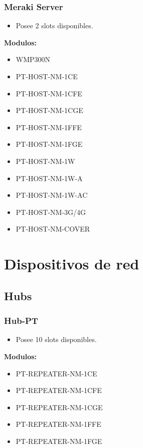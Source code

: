 \documentclass{article}
\begin{document}
\subsubsection{Meraki Server}
\begin{itemize}
    \item Posee 2 slots disponibles.
\end{itemize}
\textbf{Modulos:}
\begin{itemize}
    \item WMP300N
    \item PT-HOST-NM-1CE
    \item PT-HOST-NM-1CFE
    \item PT-HOST-NM-1CGE
    \item PT-HOST-NM-1FFE
    \item PT-HOST-NM-1FGE
    \item PT-HOST-NM-1W
    \item PT-HOST-NM-1W-A
    \item PT-HOST-NM-1W-AC
    \item PT-HOST-NM-3G/4G
    \item PT-HOST-NM-COVER
\end{itemize}

\section{Dispositivos de red}

\subsection{Hubs}

\subsubsection{Hub-PT}
\begin{itemize}
    \item Posee 10 slots disponibles.
\end{itemize}
\textbf{Modulos:}
\begin{itemize}
    \item PT-REPEATER-NM-1CE
    \item PT-REPEATER-NM-1CFE
    \item PT-REPEATER-NM-1CGE
    \item PT-REPEATER-NM-1FFE
    \item PT-REPEATER-NM-1FGE
\end{itemize}
\end{document}
